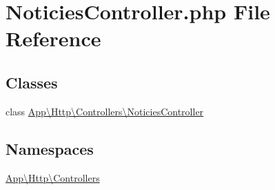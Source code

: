 \hypertarget{_noticies_controller_8php}{}\section{Noticies\+Controller.\+php File Reference}
\label{_noticies_controller_8php}
\subsection*{Classes}
\begin{DoxyCompactItemize}
\item 
class \mbox{\hyperlink{class_app_1_1_http_1_1_controllers_1_1_noticies_controller}{App\textbackslash{}\+Http\textbackslash{}\+Controllers\textbackslash{}\+Noticies\+Controller}}
\end{DoxyCompactItemize}
\subsection*{Namespaces}
\begin{DoxyCompactItemize}
\item 
 \mbox{\hyperlink{namespace_app_1_1_http_1_1_controllers}{App\textbackslash{}\+Http\textbackslash{}\+Controllers}}
\end{DoxyCompactItemize}
